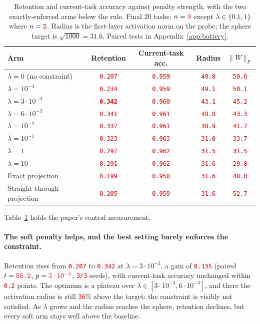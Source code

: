 \documentclass[anon]{opt2026}     %
\newcommand{\PH}[1]{\textcolor{red}{\texttt{#1}}}   %
\newcommand{\PHm}[1]{{\color{red}#1}}                  %
\begin{document}
\begin{table}[!tb]
\centering
\caption{Retention and current-task accuracy against penalty strength, with the
two exactly-enforced arms below the rule. Final $20$ tasks; $n = \PH{3}$ except
$\lambda \in \{0.1, 1\}$ where $n = \PH{2}$. Radius is the first-layer
activation norm on the probe; the sphere target is $\sqrt{1000} = 31.6$. Paired
tests in Appendix~\ref{app:battery}.}
\label{tab:sweep}
\footnotesize
\begin{tabular}{lcccc}
\toprule
Arm & Retention & Current-task acc. & Radius & $\|W\|_F$ \\
\midrule
$\lambda = 0$ (no constraint)  & \PH{0.207} & \PH{0.959} & \PH{49.8} & \PH{50.6} \\
$\lambda = 10^{-4}$            & \PH{0.234} & \PH{0.959} & \PH{49.1} & \PH{50.1} \\
$\lambda = 3\cdot 10^{-3}$     & \textbf{\PH{0.342}} & \PH{0.960} & \PH{43.1} & \PH{45.2} \\
$\lambda = 6\cdot 10^{-3}$     & \PH{0.341} & \PH{0.961} & \PH{40.8} & \PH{43.3} \\
$\lambda = 10^{-2}$            & \PH{0.337} & \PH{0.961} & \PH{38.9} & \PH{41.7} \\
$\lambda = 10^{-1}$            & \PH{0.323} & \PH{0.963} & \PH{31.0} & \PH{33.7} \\
$\lambda = 1$                  & \PH{0.297} & \PH{0.962} & \PH{31.5} & \PH{31.5} \\
$\lambda = 10$                 & \PH{0.291} & \PH{0.962} & \PH{31.6} & \PH{29.8} \\
\midrule
Exact projection               & \PH{0.199} & \PH{0.958} & \PH{31.6} & \PH{48.0} \\
Straight-through projection    & \PH{0.205} & \PH{0.959} & \PH{31.6} & \PH{52.7} \\
\bottomrule
\end{tabular}
\end{table}

Table~\ref{tab:sweep} holds the paper's central measurement.

\paragraph{The soft penalty helps, and the best setting barely enforces the
constraint.} Retention rises from \PH{0.207} to \PH{0.342} at
$\lambda = 3\cdot10^{-3}$, a gain of \PH{0.135} (paired $t = \PH{55.2}$,
$p = \PHm{3\cdot10^{-4}}$, \PH{3/3} seeds), with current-task accuracy unchanged
within \PH{0.2} points. The optimum is a plateau over
$\lambda \in [3\cdot10^{-3}, 6\cdot10^{-3}]$, and there the activation radius is
still \PH{36}\% above the target: the constraint is visibly not satisfied. As
$\lambda$ grows and the radius reaches the sphere, retention declines, but every
soft arm stays well above the baseline.
\end{document}
